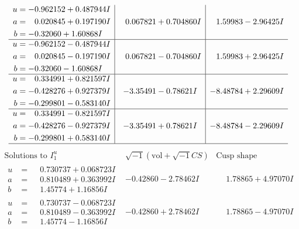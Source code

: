 \documentclass[1p]{elsarticle_modified}
\theoremstyle{definition}
\newcommand{\I}{\sqrt{-1}}
\begin{document}
$$\begin{array}{c|c|c}
\begin{aligned}
u &= -0.962152 + 0.487944 I \\
a &= \phantom{-}0.020845 + 0.197190 I \\
b &= -0.32060 + 1.60868 I\end{aligned}
 & \phantom{-}0.067821 + 0.704860 I & \phantom{-}1.59983 - 2.96425 I \\ \hline\begin{aligned}
u &= -0.962152 - 0.487944 I \\
a &= \phantom{-}0.020845 - 0.197190 I \\
b &= -0.32060 - 1.60868 I\end{aligned}
 & \phantom{-}0.067821 - 0.704860 I & \phantom{-}1.59983 + 2.96425 I \\ \hline\begin{aligned}
u &= \phantom{-}0.334991 + 0.821597 I \\
a &= -0.428276 + 0.927379 I \\
b &= -0.299801 - 0.583140 I\end{aligned}
 & -3.35491 - 0.78621 I & -8.48784 + 2.29609 I \\ \hline\begin{aligned}
u &= \phantom{-}0.334991 - 0.821597 I \\
a &= -0.428276 - 0.927379 I \\
b &= -0.299801 + 0.583140 I\end{aligned}
 & -3.35491 + 0.78621 I & -8.48784 - 2.29609 I\\
 \hline 
 \end{array}$$\newpage$$\begin{array}{c|c|c}  
\text{Solutions to }I^u_{1}& \I (\text{vol} + \sqrt{-1}CS) & \text{Cusp shape}\\
 \hline 
\begin{aligned}
u &= \phantom{-}0.730737 + 0.068723 I \\
a &= \phantom{-}0.810489 + 0.363992 I \\
b &= \phantom{-}1.45774 + 1.16856 I\end{aligned}
 & -0.42860 - 2.78462 I & \phantom{-}1.78865 + 4.97070 I \\ \hline\begin{aligned}
u &= \phantom{-}0.730737 - 0.068723 I \\
a &= \phantom{-}0.810489 - 0.363992 I \\
b &= \phantom{-}1.45774 - 1.16856 I\end{aligned}
 & -0.42860 + 2.78462 I & \phantom{-}1.78865 - 4.97070 I \\ \hline\begin{aligned}

\end{aligned}
\end{array}$$
\end{document}
